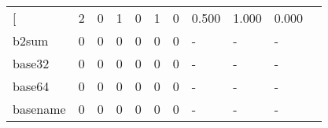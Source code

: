 \begin{longtable}{lp{1.2cm}p{1.2cm}p{1.2cm}p{1.2cm}p{1.2cm}p{1.2cm}p{1.2cm}p{1.2cm}p{1.2cm}p{1.2cm}}
\bottomrule
\endlastfoot
{[}         &                                     2 &                                                  0 &                                                  1 &                                                  0 &                                                  1 &                                                  0 &                                              0.500 &                                              1.000 &                                              0.000 \\
b2sum     &                                     0 &                                                  0 &                                                  0 &                                                  0 &                                                  0 &                                                  0 &                                                  - &                                                  - &                                                  - \\
base32    &                                     0 &                                                  0 &                                                  0 &                                                  0 &                                                  0 &                                                  0 &                                                  - &                                                  - &                                                  - \\
base64    &                                     0 &                                                  0 &                                                  0 &                                                  0 &                                                  0 &                                                  0 &                                                  - &                                                  - &                                                  - \\
basename  &                                     0 &                                                  0 &                                                  0 &                                                  0 &                                                  0 &                                                  0 &                                                  - &                                                  - &                                                  - \\

\end{longtable}
